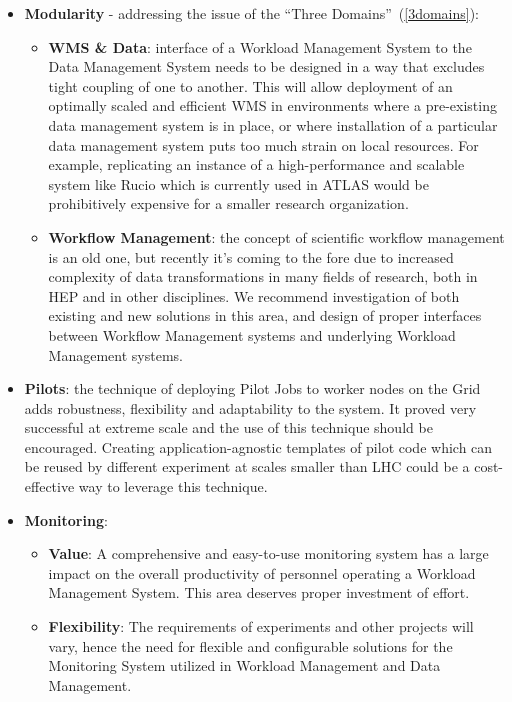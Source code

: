 \begin{itemize}

\item \textbf{Modularity} - addressing the issue of the ``Three Domains''~(\ref{3domains}):
\begin{itemize}
\item \textbf{WMS \& Data}: interface of a Workload Management System to the Data Management System needs to be designed in a way that
excludes tight coupling of one to another. This will allow deployment of an optimally scaled and efficient WMS in environments where a pre-existing
data management  system is in place, or where installation of a particular data management system puts too much strain on local resources. For example,
replicating an instance of a high-performance and scalable system like Rucio which is currently used in ATLAS would be prohibitively expensive for
a smaller research organization.

\item \textbf{Workflow Management}: the concept of scientific workflow management is an old one, but recently it's coming to the fore due to
increased complexity of data transformations in many fields of research, both in HEP and in other disciplines. We recommend investigation of both existing
and new solutions in this area, and design of proper interfaces between Workflow Management systems and underlying Workload Management systems.

\end{itemize}

\item \textbf{Pilots}: the technique of deploying Pilot Jobs to worker nodes on the Grid adds robustness, flexibility and adaptability to the system.
It proved very successful at extreme scale and the use of this technique should be encouraged. Creating application-agnostic templates of pilot code
which can be reused by different experiment at scales smaller than LHC could be a cost-effective way to leverage this technique.

\item \textbf{Monitoring}:
\begin{itemize}
\item \textbf{Value}: A comprehensive and easy-to-use monitoring system has a large impact on the overall productivity of personnel operating a Workload Management System.
This area deserves proper investment of effort.

\item \textbf{Flexibility}: The requirements of experiments and other projects will vary, hence the need for flexible and configurable solutions
for the Monitoring System utilized in Workload Management and Data Management.


\end{itemize}
\end{itemize}
